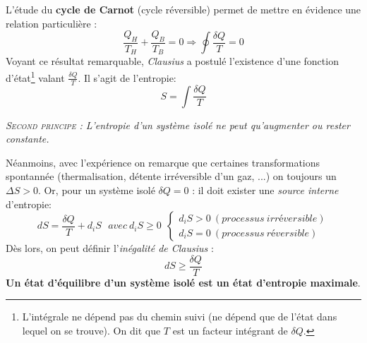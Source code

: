 \documentclass[british,french,11pt, a4paper, openany]{book}
\begin{document}
	L'étude du \textbf{cycle de Carnot} (cycle réversible) permet de mettre en évidence une relation particulière :
	\begin{equation}
	\frac{Q_H}{T_H}+\frac{Q_B}{T_B}=0\Rightarrow\oint \frac{\delta Q}{T} = 0
	\end{equation}
	Voyant ce résultat remarquable, \textit{Clausius} a postulé l'existence d'une fonction d'état\footnote{L'intégrale ne dépend pas du chemin suivi (ne dépend que de l'état dans lequel on se trouve). On dit que $T$ est un facteur intégrant de $\delta Q$.} valant $\frac{\delta Q}{T}$. Il s'agit de l'entropie:
	\begin{equation}
	S = \int \frac{\delta Q}{T}
	\end{equation}
	\begin{center}
		\textit{\textsc{Second principe :} L'entropie d'un système isolé ne peut qu'augmenter ou rester constante.}
	\end{center}
	Néanmoins, avec l'expérience on remarque que certaines transformations spontannée (thermalisation, détente irréversible d'un gaz, ...) on toujours un $\Delta S > 0$. Or, pour un système isolé $\delta Q  = 0$ : il doit exister une \textit{source interne} d'entropie:
	\begin{equation}
	dS = \frac{\delta Q}{T} + d_i S\ \ \ avec\ d_iS \geq 0\ \ \left\{\begin{array}{l}
	d_iS > 0\ (processus\ irréversible)\\
	d_iS = 0\ (processus\ réversible)
	\end{array}\right.
	\end{equation}
	Dès lors, on peut définir l'\textit{inégalité de Clausius} : 
	\begin{equation}
	dS \geq \frac{\delta Q}{T}
	\end{equation}
	\textbf{Un état d'équilibre d'un système isolé est un état d'entropie maximale}.\\
	
	
\end{document}
